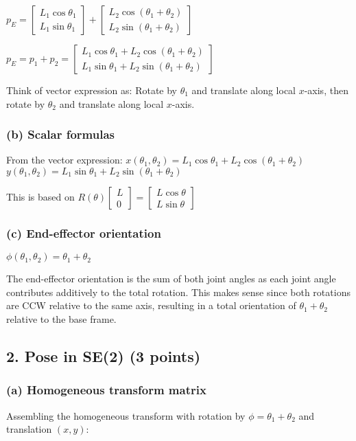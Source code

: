 \documentclass[11pt]{article}
\begin{document}
$p_E = \begin{bmatrix} L_1\cos\theta_1 \\ L_1\sin\theta_1 \end{bmatrix} + \begin{bmatrix} L_2\cos(\theta_1 + \theta_2) \\ L_2\sin(\theta_1 + \theta_2) \end{bmatrix}$

$p_E = p_1 + p_2 = \begin{bmatrix} L_1\cos\theta_1 + L_2\cos(\theta_1 + \theta_2) \\ L_1\sin\theta_1 + L_2\sin(\theta_1 + \theta_2) \end{bmatrix}$

Think of vector expression as: Rotate by $\theta_1$ and translate along local $x$-axis, then rotate by $\theta_2$ and translate along local $x$-axis.

\subsubsection*{(b) Scalar formulas}
From the vector expression:
$x(\theta_1, \theta_2) = L_1\cos\theta_1 + L_2\cos(\theta_1 + \theta_2)$
$y(\theta_1, \theta_2) = L_1\sin\theta_1 + L_2\sin(\theta_1 + \theta_2)$

This is based on $R(\theta)\begin{bmatrix} L \\ 0 \end{bmatrix} = \begin{bmatrix} L\cos\theta \\ L\sin\theta \end{bmatrix}$

\subsubsection*{(c) End-effector orientation}
$\phi(\theta_1, \theta_2) = \theta_1 + \theta_2$

The end-effector orientation is the sum of both joint angles as each joint angle contributes additively to the total rotation. This makes sense since both rotations are CCW relative to the same axis, resulting in a total orientation of $\theta_1 + \theta_2$ relative to the base frame.

\subsection*{2. Pose in SE(2) (3 points)}
\subsubsection*{(a) Homogeneous transform matrix}
Assembling the homogeneous transform with rotation by $\phi = \theta_1 + \theta_2$ and translation $(x, y)$:
\end{document}
